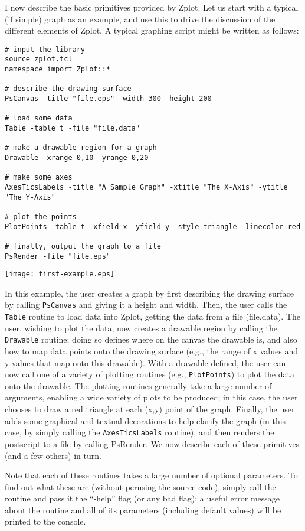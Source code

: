 I now describe the basic primitives provided by Zplot. Let us start with a
typical (if simple) graph as an example, and use this to drive the discussion
of the different elements of Zplot. A typical graphing script might be written
as follows:

\begin{verbatim}
# input the library
source zplot.tcl
namespace import Zplot::*

# describe the drawing surface
PsCanvas -title "file.eps" -width 300 -height 200
  
# load some data
Table -table t -file "file.data" 

# make a drawable region for a graph
Drawable -xrange 0,10 -yrange 0,20

# make some axes
AxesTicsLabels -title "A Sample Graph" -xtitle "The X-Axis" -ytitle "The Y-Axis"

# plot the points
PlotPoints -table t -xfield x -yfield y -style triangle -linecolor red

# finally, output the graph to a file
PsRender -file "file.eps"
\end{verbatim}

\texttt{[image: first-example.eps]}

In this example, the user creates a graph by first describing the drawing
surface by calling \texttt{PsCanvas} and giving it a height and width. Then,
the user calls the \texttt{Table} routine to load data into Zplot, getting the
data from a file (file.data). The user, wishing to plot the data, now creates
a drawable region by calling the \texttt{Drawable} routine; doing so defines
where on the canvas the drawable is, and also how to map data points onto the
drawing surface (e.g., the range of x values and y values that map onto this
drawable). With a drawable defined, the user can now call one of a variety of
plotting routines (e.g., \texttt{PlotPoints}) to plot the data onto the
drawable. The plotting routines generally take a large number of arguments,
enabling a wide variety of plots to be produced; in this case, the user
chooses to draw a red triangle at each (x,y) point of the graph. Finally, the
user adds some graphical and textual decorations to help clarify the graph (in
this case, by simply calling the \texttt{AxesTicsLabels} routine), and then
renders the postscript to a file by calling PsRender.  We now describe each of
these primitives (and a few others) in turn.

Note that each of these routines takes a large number of optional parameters.
To find out what these are (without perusing the source code), simply call the
routine and pass it the ``-help'' flag (or any bad flag); a useful error
message about the routine and all of its parameters (including default values)
will be printed to the console.

